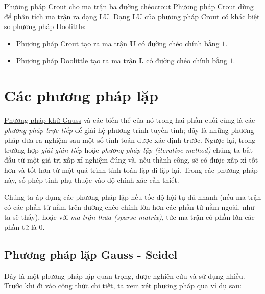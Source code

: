 \documentclass[../../Lectures]{subfiles}
\begin{document}
\begin{cmethod}{Phương pháp Crout cho ma trận ba đường chéo}{crout}
    Phương pháp Crout dùng để phân tích ma trận ra dạng LU. Dạng LU của phương
    pháp Crout có khác biệt so phương pháp Doolittle:
    \begin{itemize}
        \item Phương pháp Crout tạo ra ma trận \(\bm{U}\) có đường chéo chính
            bằng \(1\).
        \item Phương pháp Doolittle tạo ra ma trận \(\bm{L}\) có đường chéo
            chính bằng \(1\).
    \end{itemize}
\end{cmethod}



\section{Các phương pháp lặp}

\hyperref[method:gauss_elimination]{Phương pháp khử Gauss} và các biến thể của
nó trong hai phần cuối cùng là các \emph{phương pháp trực tiếp} để giải hệ
phương trình tuyến tính; đây là những phương pháp đưa ra nghiệm sau một số tính
toán được xác định trước. Ngược lại, trong trường hợp \emph{giải gián tiếp} hoặc
\emph{phương pháp lặp (iterative method)} chúng ta bắt đầu từ một giá trị xấp xỉ
nghiệm đúng và, nếu thành công, sẽ có được xấp xỉ tốt hơn và tốt hơn từ một quá
trình tính toán lặp đi lặp lại. Trong các phương pháp này, số phép tính phụ
thuộc vào độ chính xác cần thiết.

Chúng ta áp dụng các phương pháp lặp nếu tốc độ hội tụ đủ nhanh (nếu ma trận có
các phần tử nằm trên đường chéo chính lớn hơn các phần tử nằm ngoài, như ta sẽ
thấy), hoặc với \emph{ma trận thưa (sparse matrix)}, tức ma trận có phần lớn các
phần tử là \(0\).

\subsection{Phương pháp lặp Gauss - Seidel}

Đây là một phương pháp lặp quan trọng, được nghiên cứu và sử dụng nhiều. Trước
khi đi vào công thức chi tiết, ta xem xét phương pháp qua ví dụ sau:
\end{document}
